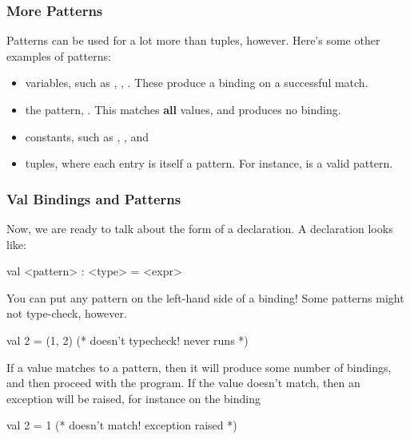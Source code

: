 \documentclass[aspectratio=169]{beamer}
\begin{document}
\begin{frame}[fragile]
  \frametitle{More Patterns}

  Patterns can be used for a lot more than tuples, however. Here's some other examples of patterns:

  \pause
  \vspace{\fill}

  \begin{itemize}
    \item variables, such as , , . These produce a binding on a successful match.
    \item the  pattern, \code{_}. This matches \textbf{all} values, and 
    produces no binding.
    \item constants, such as , , and 
    \item tuples, where each entry is itself a pattern. For instance,  is 
    a valid pattern.
  \end{itemize}
\end{frame}

\begin{frame}[fragile]
  \frametitle{Val Bindings and Patterns}

  Now, we are ready to talk about the form of a  declaration. A  declaration looks like:

  \vspace{\fill}

  \begin{codeblock}
    val <pattern> : <type> = <expr>
  \end{codeblock}

  \pause
  \vspace{\fill}

  You can put any pattern on the left-hand side of a binding! Some patterns might not type-check,
  however.
  \begin{codeblock}
    val 2 = (1, 2) (* doesn't typecheck! never runs *)
  \end{codeblock}

  \pause
  \vspace{\fill}

  If a value matches to a pattern, then it will produce some number of bindings, and then proceed
  with the program. If the value doesn't match, then an exception will be raised, for instance
  on the binding
  \begin{codeblock}
    val 2 = 1 (* doesn't match! exception raised *) 
  \end{codeblock}
\end{frame}
\end{document}

